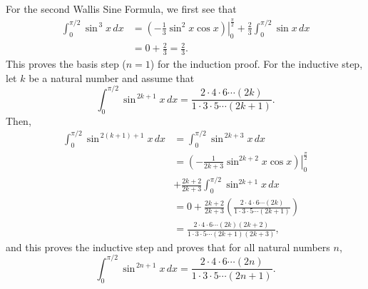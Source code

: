 \begin{enumerate}
\begin{enumerate}
For the second Wallis Sine Formula, we first see that
\begin{align*}
\int_{0}^{\pi/2} \sin^{\,3} x \, dx &= \left( \left. -\frac{1}{3} \sin^{2}x \cos x \right) \right|_0^{\frac{\pi}{2}} + \frac{2}{3} \int_{0}^{\pi/2} \sin x \, dx  \\
             &= 0 + \frac{2}{3} = \frac{2}{3}.
\end{align*}
This proves the basis step ($n = 1$) for the induction proof.  For the inductive step, let $k$ be a natural number and assume that
\[
\int_{0}^{\pi/2} \sin^{\,2k+1}x \, dx = \frac{2 \cdot 4 \cdot 6 \cdots (2k)}{1 \cdot 3 \cdot 5 \cdots (2k + 1)}.
\]
Then,
\begin{align*}
\int_{0}^{\pi/2} \sin^{\,2(k+1) + 1}x \, dx &= \int_{0}^{\pi/2} \sin^{\,2k + 3}x \, dx \\
  &= \left( \left. -\frac{1}{2k + 3} \sin^{2k+2}x \cos x \right) \right|_0^{\frac{\pi}{2}} \\ &+ \frac{2k+2}{2k+3} \int_{0}^{\pi/2} \sin^{2k+1}x \, dx \\
  &= 0 + \frac{2k+2}{2k+3} \left(\frac{2 \cdot 4 \cdot 6 \cdots (2k)}{1 \cdot 3 \cdot 5 \cdots (2k+1)} \right) \\
  &= \frac{2 \cdot 4 \cdot 6 \cdots (2k)(2k + 2)}{1 \cdot 3 \cdot 5 \cdots (2k+1)(2k + 3)},
\end{align*}
and this proves the inductive step and proves that for all natural numbers $n$,
\[
\int_{0}^{\pi/2} \sin^{\,2n+1}x \, dx = \frac{2 \cdot 4 \cdot 6 \cdots (2n)}{1 \cdot 3 \cdot 5 \cdots (2n + 1)}.
\]


\end{enumerate}
\end{enumerate}
